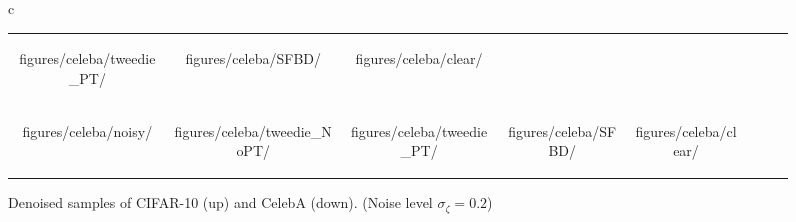 \begin{figure}[!t]
{\begin{tabular}{c}
\begin{tabular}{cccccccc}
            \begin{overpic}[width=\imagewidthb]{figures/celeba/tweedie_PT/\celebaimgidxa}\end{overpic} & %
            \begin{overpic}[width=\imagewidthb]{figures/celeba/SFBD/\celebaimgidxa}\end{overpic} & %
            \begin{overpic}[width=\imagewidthb]{figures/celeba/clear/\celebaimgidxa}\end{overpic} \\ %


            \begin{overpic}[width=\imagewidthb]{figures/celeba/noisy/\celebaimgidxb}\end{overpic} & %
            \begin{overpic}[width=\imagewidthb]{figures/celeba/tweedie_NoPT/\celebaimgidxb}\end{overpic} & %
            \begin{overpic}[width=\imagewidthb]{figures/celeba/tweedie_PT/\celebaimgidxb}\end{overpic} & %
            \begin{overpic}[width=\imagewidthb]{figures/celeba/SFBD/\celebaimgidxb}\end{overpic} & %
            \begin{overpic}[width=\imagewidthb]{figures/celeba/clear/\celebaimgidxb}\end{overpic} \\ %

        \end{tabular}
    \end{tabular}
    }
    \caption{Denoised samples of CIFAR-10 (up) and CelebA (down). (Noise level $\sigma_\zeta = 0.2$)} 
    \label{fig:model_benchmark_visual}
\end{figure}